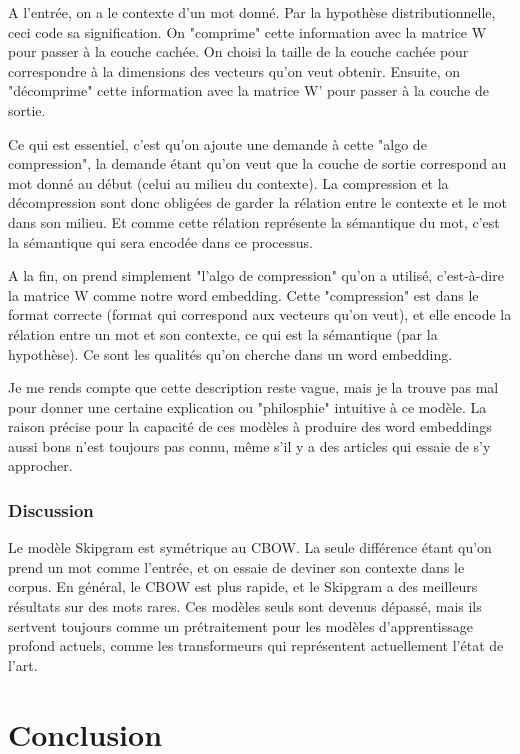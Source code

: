 \documentclass[11pt, a4paper]{report}
\begin{document}
A l'entrée, on a le contexte d'un mot donné. Par la hypothèse distributionnelle, ceci code 
sa signification. On "comprime" cette information avec la matrice W pour passer à la couche 
cachée. On choisi la taille de la couche cachée pour correspondre à la dimensions des vecteurs 
qu'on veut obtenir. Ensuite, on "décomprime" cette information avec la matrice W' 
pour passer à la couche de sortie. 

Ce qui est essentiel, c'est qu'on ajoute une demande  
à cette "algo de compression", la demande étant qu'on veut que la couche de sortie 
correspond au mot donné au début (celui au milieu du contexte). La compression et la 
décompression sont donc obligées de garder la rélation entre le contexte et le mot dans son 
milieu. Et comme cette rélation représente la sémantique du mot, c'est la sémantique qui sera 
encodée dans ce processus. 

A la fin, on prend simplement "l'algo de compression" qu'on a utilisé, c'est-à-dire la matrice 
W comme notre word embedding. Cette "compression" est dans le format correcte (format qui 
correspond aux vecteurs qu'on veut), et elle encode la rélation entre un mot et son contexte, 
ce qui est la sémantique (par la hypothèse). Ce sont les qualités qu'on cherche dans un word 
embedding. 

Je me rends compte que cette description reste vague, mais je la trouve pas mal pour donner une
certaine explication ou "philosphie" intuitive à ce modèle. La raison précise pour la capacité de ces 
modèles à produire des word embeddings aussi bons n'est toujours pas connu, 
même s'il y a des articles qui essaie de s'y approcher. 

\subsection{Discussion}
\cite{wikipedia-wembedding} Le modèle Skipgram est symétrique au CBOW. La seule différence étant qu'on prend un mot comme l'entrée, 
et on essaie de deviner son contexte dans le corpus. En général, le CBOW est plus rapide, et le 
Skipgram a des meilleurs résultats sur des mots rares. Ces modèles 
seuls sont devenus dépassé, mais ils sertvent toujours comme un prétraitement pour les modèles 
d'apprentissage profond actuels, comme les transformeurs qui représentent actuellement l'état 
de l'art.  

\chapter{Conclusion}



\end{document}
